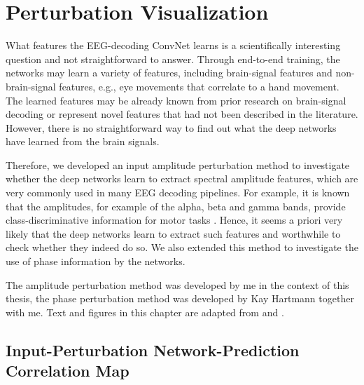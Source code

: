 \chapter{Perturbation Visualization}\label{perturbation-visualization}


    What features the EEG-decoding ConvNet learns is a scientifically
interesting question and not straightforward to answer. Through
end-to-end training, the networks may learn a variety of features,
including brain-signal features and non-brain-signal features, e.g., eye
movements that correlate to a hand movement. The learned features may be
already known from prior research on brain-signal decoding or represent
novel features that had not been described in the literature. However,
there is no straightforward way to find out what the deep networks have
learned from the brain signals.

    Therefore, we developed an input amplitude perturbation method to
investigate whether the deep networks learn to extract spectral
amplitude features, which are very commonly used in many EEG decoding
pipelines. For example, it is known that the amplitudes, for example of
the alpha, beta and gamma bands, provide class-discriminative
information for motor tasks
\citep{ball_movement_2008,pfurtscheller_evaluation_1979,pfurtscheller_central_1981}.
Hence, it seems a priori very likely that the deep networks learn to
extract such features and worthwhile to check whether they indeed do so.
We also extended this method to investigate the use of phase information
by the networks.

The amplitude perturbation method was developed by me in the context of
this thesis, the phase perturbation method was developed by Kay Hartmann
together with me. Text and figures in this chapter are adapted from
\citep{schirrmeisterdeephbm2017} and \citep{hartmann2018hierarchical}.



\section{Input-Perturbation Network-Prediction Correlation
Map}\label{input-perturbation-network-prediction-correlation-map}


